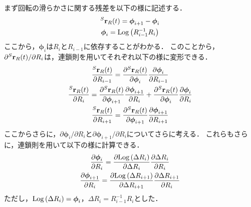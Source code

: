 まず回転の滑らかさに関する残差を以下の様に記述する．
%
\begin{align}
  \begin{gathered}
    {}^{S}{\bf r}_{R}(t) = \boldsymbol \phi_{i+1} - \boldsymbol \phi_{i} \\
    \boldsymbol \phi_{i} = {\rm Log} \left( R_{i-1}^{-1} R_{i} \right)
  \end{gathered}
\end{align}
%
ここから，$\boldsymbol \phi_{i}$は$R_{i}$と$R_{i-1}$に依存することがわかる．
このことから，$\partial {}^{S}{\bf r}_{R}(t) / \partial R_{i}$は，連鎖則を用いてそれぞれ以下の様に変形できる．
%
\begin{align}
  \begin{gathered}
    \frac{ {}^{S}{\bf r}_{R}(t) }{ \partial R_{i-1} }
    = 
    \frac{ \partial {}^{S}{\bf r}_{R}(t) }{ \partial \boldsymbol \phi_{i} }
    \frac{ \partial \boldsymbol \phi_{i} }{ \partial R_{i-1} } \\
    \frac{ {}^{S}{\bf r}_{R}(t) }{ \partial R_{i} }
    = 
    \frac{ \partial {}^{S}{\bf r}_{R}(t) }{ \partial \boldsymbol \phi_{i+1} }
    \frac{ \partial \boldsymbol \phi_{i+1} }{ \partial R_{i} }
    +
    \frac{ \partial {}^{S}{\bf r}_{R}(t) }{ \partial \boldsymbol \phi_{i} }
    \frac{ \partial \boldsymbol \phi_{i} }{ \partial R_{i} } \\
    \frac{ {}^{S}{\bf r}_{R}(t) }{ \partial R_{i+1} }
    = 
    \frac{ \partial {}^{S}{\bf r}_{R}(t) }{ \partial \boldsymbol \phi_{i+1} }
    \frac{ \partial \boldsymbol \phi_{i+1} }{ \partial R_{i+1} }
  \end{gathered}
\end{align}
%
ここからさらに，$\partial \boldsymbol \phi_{i} / \partial R_{i}$と$\partial \boldsymbol \phi_{i+1} / \partial R_{i}$についてさらに考える．
これらもさらに，連鎖則を用いて以下の様に計算できる．
%
\begin{align}
  \begin{gathered}
    \frac{ \partial \boldsymbol \phi_{i} }{ \partial R_{i} }
    = 
    \frac{ \partial {\rm Log} \left( \Delta R_{i} \right) }{ \partial \Delta R_{i} }
    \frac{ \partial \Delta R_{i} }{ \partial R_{i} } \\
    \frac{ \partial \boldsymbol \phi_{i+1} }{ \partial R_{i} }
    = 
    \frac{ \partial {\rm Log} \left( \Delta R_{i+1} \right) }{ \partial \Delta R_{i+1} }
    \frac{ \partial \Delta R_{i+1} }{ \partial R_{i} } \\
  \end{gathered}
\end{align}
%
ただし，${\rm Log} \left( \Delta R_{i} \right) = \boldsymbol \phi_{i}$，$\Delta R_{i} = R_{i-1}^{-1} R_{i}$とした．

